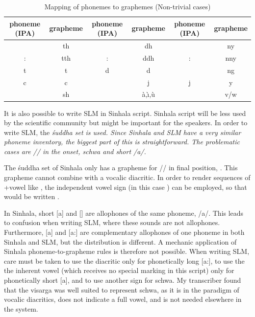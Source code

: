 \begin{table}
	\begin{center}
		\begin{tabular}{cc|cc|cc}
		phoneme (IPA) & grapheme & phoneme (IPA) 	& grapheme 	&phoneme (IPA) & grapheme \\ 
		\hline
		\dentt		& th    &        \dentd  	& dh 		&     \ny	& ny  \\ 
		\dentt:		& tth  	 &        \dentd: 	&ddh 		&    \ny: 	& nny\\
		t		& t      &        d 		& d  		&    \ng 	& ng \\
		c		& c      &        \J 		& j  		&    j 		& y \\
		 \textesh    	& sh      &        \E    	&  \`a,\`{\i},\`u	&     \V  	& v/w \\
		\end{tabular}
		\caption[Mapping of phonemes to graphemes]{Mapping of phonemes to graphemes (Non-trivial cases)}
		\label{tab:PhonemeMapping}
	\end{center}
\end{table}



It is also possible to write SLM in Sinhala script. Sinhala script will be less used by the scientific community but might be important for the speakers. In order to write SLM, the \em \'suddha  \em set is used. Since Sinhala and SLM have a very similar phoneme inventory, the biggest part of this is straightforward. The problematic cases are /\ng/ in the onset, schwa and short /a/.

The \'suddha set of Sinhala only has a grapheme for /\ng/ in final position, \graphem{\binduva}. This grapheme cannot combine with a vocalic diacritic. In order to render sequences of \ng +vowel like , the independent vowel sign (in this case \graphem{\SinhI}) can be employed, so that  would be written .


In Sinhala, short [a] and [\E] are allophones of the same phoneme, /a/. This leads to confusion when writing SLM, where these sounds are not allophones. Furthermore, [a] and [a:] are complementary allophones of one phoneme in both Sinhala and SLM, but the distribution is different. A mechanic application of Sinhala phoneme-to-grapheme rules is therefore not possible.  When writing SLM, care must be taken to use the diacritic  only for phonetically long [a:], to use the the inherent vowel (which receives no special marking in this script) only for phonetically short [a], and to use another sign for schwa. My transcriber found that the visarga \graphem{\visarga{}} was well suited to represent schwa, as it is in the paradigm of vocalic diacritics, does not indicate a full vowel, and is not needed elsewhere in the system.

